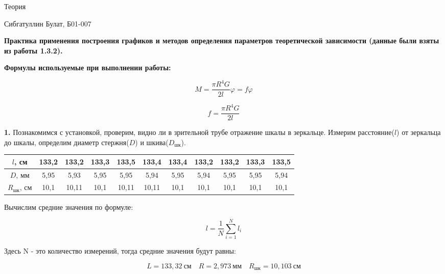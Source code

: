 \documentclass[12pt,a4paper]{article}
\begin{document}
\begin{center}
    \large
    Теория
    
    Сибгатуллин Булат, Б01-007
    
    \vspace{0.5cm}
    \textbf{Практика применения построения графиков и методов определения параметров теоретической зависимости (данные были взяты из работы 1.3.2).}

\end{center}

\textbf{Формулы используемые при выполнении работы:}

\begin{equation}\label{6}
    M = \frac{\pi R^4 G}{2l}\varphi = f\varphi
\end{equation}

\begin{equation}\label{7}
    f = \frac{\pi R^4 G}{2l}
\end{equation}

\textbf{1.} Познакомимся с установкой, проверим, видно ли в зрительной трубе отражение шкалы в зеркальце. Измерим расстояние($l$) от зеркальца до шкалы, определим диаметр стержня($D$) и шкива($D_{\text{шк}}$).

\vspace{0,5cm}

\begin{tabular}{|c|c|c|c|c|c|c|c|c|c|c|}
\hline
$l$, см & 133,2 & 133,2 & 133,3 & 133,5 & 133,4 & 133,4 & 133,2 & 133,2 & 133,3 & 133,5 \\
\hline
$D$, мм & 5,95 & 5,93 & 5,95 & 5,95 & 5,94 & 5,95 & 5,94 & 5,95 & 5,95 & 5,94 \\
\hline
$R_{\text{шк}}$, см & 10,1 & 10,11 & 10,1 & 10,11 & 10,11 & 10,1 & 10,1 & 10,1 & 10,1 & 10,1 \\
\hline
\end{tabular}

\vspace{0,5cm}

Вычислим средние значения по формуле:

\begin{equation}\label{13}
l = \frac{1}{N} \sum\limits_{\textit{i} = 1}^N l_{\textit{i}}
\end{equation}

Здесь N - это количество измерений, тогда средние значения будут равны:

\[L = 133,32 \: \textit{см} \quad R = 2,973 \: \textit{мм} \quad R_{\text{шк}} = 10,103 \: \textit{см}\]
\end{document}
